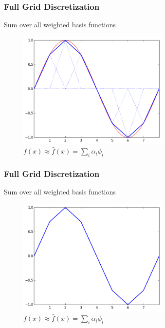 \begin{frame}
  \frametitle{Full Grid Discretization}
  \topline
  \vspace{-10px}
  \begin{block}{Sum over all weighted basis functions}
    \begin{figure}[!htp]

      \centering
      \includegraphics[width=7.5cm]{images/singlebasis_5}
      \vspace{-12px}
      \caption{$f(x) \approx \hat{f}(x) = \sum_i{\alpha_i \phi_i}$}
    \end{figure}
  \end{block}
\end{frame}

\begin{frame}
  \frametitle{Full Grid Discretization}
  \topline
  \vspace{-10px}
  \begin{block}{Sum over all weighted basis functions}
    \begin{figure}[!htp]

      \centering
      \includegraphics[width=7.5cm]{images/singlebasis_6}
      \vspace{-12px}
      \caption{$f(x) \approx \hat{f}(x) = \sum_i{\alpha_i \phi_i}$}
    \end{figure}
  \end{block}
\end{frame}

